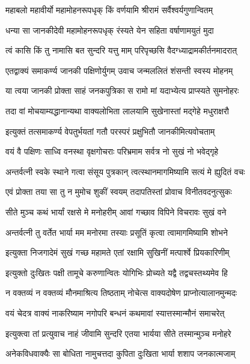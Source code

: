 \twolineshloka
{महाबलो महावीर्यो महामोहनरूपधृक्}
{किं वर्णयामि श्रीरामं सर्वैश्वर्यगुणान्वितम्}%

\twolineshloka
{धन्या सा जानकीदेवी महामोहनरूपधृक्}
{रंस्यते येन सहिता वर्षाणामयुतं मुदा}%

\twolineshloka
{त्वं कासि किं तु नामासि बत सुन्दरि यत्तु माम्}
{परिपृच्छसि वैदग्ध्याद्रामकीर्तनमादरात्}%

\twolineshloka
{एतद्वाक्यं समाकर्ण्य जानकी पक्षिणोर्युगम्}
{उवाच जन्मललितं शंसन्ती स्वस्य मोहनम्}%

\twolineshloka
{या त्वया जानकी प्रोक्ता साहं जनकपुत्रिका}
{स रामो मां यदाभ्येत्य प्राप्स्यते सुमनोहरः}%

\twolineshloka
{तदा वां मोचयाम्यद्धानान्यथा वाक्यलोभिता}
{लालयामि सुखेनास्तां मद्गेहे मधुराक्षरौ}%

\twolineshloka
{इत्युक्तं तत्समाकर्ण्य वेपतुर्भयतां गतौ}
{परस्परं प्रक्षुभितौ जानकीमित्यवोचताम्}%

\twolineshloka
{वयं वै पक्षिणः साध्वि वनस्था वृक्षगोचराः}
{परिभ्रमाम सर्वत्र नो सुखं नो भवेद्गृहे}%

\twolineshloka
{अन्तर्वत्नी स्वके स्थाने गत्वा संसूय पुत्रकान्}
{त्वत्स्थानमागमिष्यामि सत्यं मे ह्युदितं वचः}%

\twolineshloka
{एवं प्रोक्ता तया सा तु न मुमोच शुकीं स्वयम्}
{तदापतिस्तां प्रोवाच विनीतवदनुत्सुकः}%

\twolineshloka
{सीते मुञ्च कथं भार्यां रक्षसे मे मनोहरीम्}
{आवां गच्छाव विपिने विचरावः सुखं वने}%

\twolineshloka
{अन्तर्वत्नी तु वर्तेत भार्या मम मनोरमा}
{तस्याः प्रसूतिं कृत्वा त्वामागमिष्यामि शोभने}%

\twolineshloka
{इत्युक्ता निजगादेमं सुखं गच्छ महामते}
{एतां रक्षामि सुखिनीं मत्पार्श्वे प्रियकारिणीम्}%

\twolineshloka
{इत्युक्तो दुःखितः पक्षी तामूचे करुणान्वितः}
{योगिभिः प्रोच्यते यद्वै तद्वचस्तथ्यमेव हि}%

\twolineshloka
{न वक्तव्यं न वक्तव्यं मौनमाश्रित्य तिष्ठताम्}
{नोचेत्स वाक्यदोषेण प्राप्नोत्यालानमुन्मदः}%

\twolineshloka
{वयं चेदत्र वाक्यं नाकरिष्याम नगोपरि}
{बन्धनं कथमावां स्यात्तस्मान्मौनं समाचरेत्}%

\twolineshloka
{इत्युक्त्वा तां प्रत्युवाच नाहं जीवामि सुन्दरि}
{एतया भार्यया सीते तस्मान्मुञ्च मनोहरे}%

\twolineshloka
{अनेकविधवाक्यैः सा बोधिता नामुचत्तदा}
{कुपिता दुःखिता भार्या शशाप जनकात्मजाम्}%

